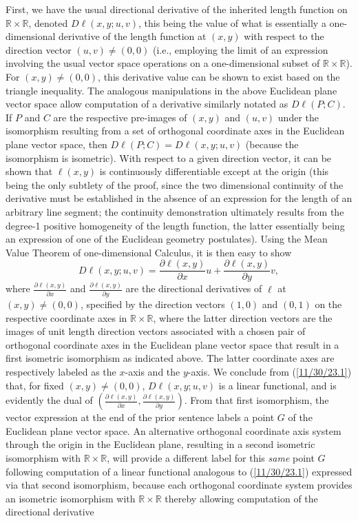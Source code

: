 \documentclass{amsart}
\numberwithin{equation}{section}
\theoremstyle{definition}
\numberwithin{theorem}{section}
\begin{document}
 First,  we have the usual directional derivative of the inherited length function on $\mathbb{R}\times\mathbb{R}$, denoted $D\ell(x,y;u,v)$, this being the value of what is essentially a one-dimensional derivative of the length function at $(x,y)$ with respect to the direction vector $(u,v)\ne (0,0)$ (i.e., employing the limit of an expression involving the usual vector space operations on a one-dimensional subset of $\mathbb{R}\times\mathbb{R}$).  For $(x,y)\ne (0,0)$, this derivative value can be shown to exist based on the triangle inequality. The analogous manipulations in the above Euclidean plane vector space allow computation of a derivative similarly notated as $D\ell(P;C)$.  If $P$ and $C$ are the respective pre-images of $(x,y)$ and $(u,v)$ under the isomorphism resulting from a set of orthogonal coordinate axes in the Euclidean plane vector space, then $D\ell(P;C) = D\ell(x,y;u,v)$ (because the isomorphism is isometric).  With respect to a given direction vector, it can be shown that $\ell(x,y)$ is continuously differentiable except at the origin (this being the only subtlety of the proof, since the two dimensional continuity of the derivative must be established in the absence of an expression for the length of an arbitrary line segment; the continuity demonstration ultimately results from the degree-1 positive homogeneity of the length function, the latter essentially being an expression of one of the Euclidean geometry postulates).  Using the Mean Value Theorem of one-dimensional Calculus, it is then easy to show \begin{equation}\label{11/30/23.1} D\ell(x,y;u,v) = \frac{\partial \ell(x,y)}{\partial x}u + \frac{\partial \ell(x,y)}{\partial y}v,\end{equation} where $\frac{\partial \ell(x,y)}{\partial x}$ and $\frac{\partial \ell(x,y)}{\partial y}$ are the directional derivatives of $\ell$ at $(x,y)\ne(0,0)$, specified by the direction vectors $(1,0)$ and $(0,1)$ on the respective coordinate axes in $\mathbb{R}\times\mathbb{R}$, where the latter direction vectors are the images of unit length direction vectors associated with a chosen pair of orthogonal coordinate axes in the Euclidean plane vector space that result in a first isometric isomorphism as indicated above.  The latter coordinate axes are respectively labeled as the $x$-axis and the $y$-axis. We conclude from (\ref{11/30/23.1}) that, for fixed $(x,y)\ne (0,0)$,  $D\ell(x,y;u,v)$ is a linear functional, and is evidently the dual of $\left(\frac{\partial\ell(x,y)}{\partial x}, \frac{\partial\ell(x,y)}{\partial y}\right)$.  From that first isomorphism, the vector expression at the end of the prior sentence labels a point $G$ of the Euclidean plane vector space.  An alternative orthogonal coordinate axis system through the origin in the Euclidean plane, resulting in a second isometric isomorphism with $\mathbb{R}\times\mathbb{R}$, will provide a different label for this {\it same} point $G$ following computation of a linear functional analogous to (\ref{11/30/23.1}) expressed via that second isomorphism, because each orthogonal coordinate system provides an isometric isomorphism with $\mathbb{R}\times\mathbb{R}$ thereby allowing computation of the directional derivative 
\end{document}
